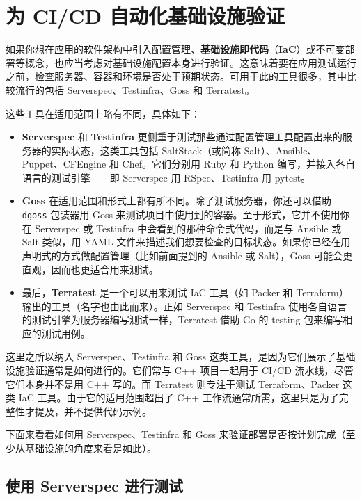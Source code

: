 \section{为 CI/CD 自动化基础设施验证}

\label{idx:880}
\label{idx:881}
如果你想在应用的软件架构中引入配置管理、\textbf{基础设施即代码}（\textbf{IaC}）或不可变部署等概念，也应当考虑对基础设施配置本身进行验证。这意味着要在应用测试运行之前，检查服务器、容器和环境是否处于预期状态。可用于此的工具很多，其中比较流行的包括 Serverspec、Testinfra、Goss 和 Terratest。

这些工具在适用范围上略有不同，具体如下：

\begin{itemize}
\label{idx:882}
\label{idx:883}
\item \textbf{Serverspec} 和 \textbf{Testinfra} 更侧重于测试那些通过配置管理工具配置出来的服务器的实际状态，这类工具包括 SaltStack（或简称 Salt）、Ansible、Puppet、CFEngine 和 Chef。它们分别用 Ruby 和 Python 编写，并接入各自语言的测试引擎——即 Serverspec 用 RSpec、Testinfra 用 pytest。
\label{idx:884}
\item \textbf{Goss} 在适用范围和形式上都有所不同。除了测试服务器，你还可以借助 \texttt{dgoss} 包装器用 Goss 来测试项目中使用到的容器。至于形式，它并不使用你在 Serverspec 或 Testinfra 中会看到的那种命令式代码，而是与 Ansible 或 Salt 类似，用 YAML 文件来描述我们想要检查的目标状态。如果你已经在用声明式的方式做配置管理（比如前面提到的 Ansible 或 Salt），Goss 可能会更直观，因而也更适合用来测试。
\label{idx:885}
\item 最后，\textbf{Terratest} 是一个可以用来测试 IaC 工具（如 Packer 和 Terraform）输出的工具（名字也由此而来）。正如 Serverspec 和 Testinfra 使用各自语言的测试引擎为服务器编写测试一样，Terratest 借助 Go 的 testing 包来编写相应的测试用例。
\end{itemize}

\label{idx:886}
这里之所以纳入 Serverspec、Testinfra 和 Goss 这类工具，是因为它们展示了基础设施验证通常是如何进行的。它们常与 C++ 项目一起用于 CI/CD 流水线，尽管它们本身并不是用 C++ 写的。而 Terratest 则专注于测试 Terraform、Packer 这类 IaC 工具。由于它的适用范围超出了 C++ 工作流通常所需，这里只是为了完整性才提及，并不提供代码示例。

下面来看看如何用 Serverspec、Testinfra 和 Goss 来验证部署是否按计划完成（至少从基础设施的角度来看是如此）。

\subsection{使用 Serverspec 进行测试}

